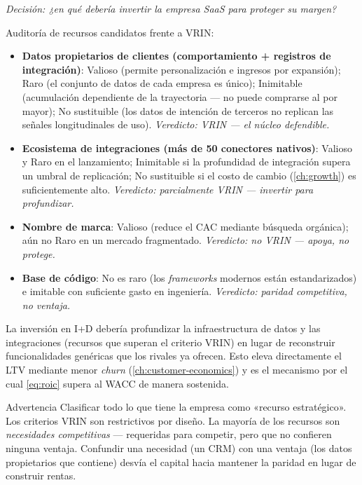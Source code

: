\begin{example}
\emph{Decisión: ¿en qué debería invertir la empresa SaaS para proteger su margen?}

Auditoría de recursos candidatos frente a VRIN:

\begin{itemize}
  \item \textbf{Datos propietarios de clientes (comportamiento + registros de integración)}: Valioso
        (permite personalización e ingresos por expansión); Raro (el conjunto de datos de cada
        empresa es único); Inimitable (acumulación dependiente de la trayectoria --- no puede
        comprarse al por mayor); No sustituible (los datos de intención de terceros no replican
        las señales longitudinales de uso). \emph{Veredicto: VRIN --- el núcleo defendible.}
  \item \textbf{Ecosistema de integraciones (más de 50 conectores nativos)}: Valioso y Raro en el
        lanzamiento; Inimitable si la profundidad de integración supera un umbral de replicación;
        No sustituible si el costo de cambio (\cref{ch:growth}) es suficientemente alto.
        \emph{Veredicto: parcialmente VRIN --- invertir para profundizar.}
  \item \textbf{Nombre de marca}: Valioso (reduce el CAC mediante búsqueda orgánica); aún no
        Raro en un mercado fragmentado. \emph{Veredicto: no VRIN --- apoya, no protege.}
  \item \textbf{Base de código}: No es raro (los \emph{frameworks} modernos están estandarizados)
        e imitable con suficiente gasto en ingeniería. \emph{Veredicto: paridad competitiva, no
        ventaja.}
\end{itemize}

La inversión en I+D debería profundizar la infraestructura de datos y las integraciones
(recursos que superan el criterio VRIN) en lugar de reconstruir funcionalidades genéricas que
los rivales ya ofrecen. Esto eleva directamente el LTV mediante menor \emph{churn}
(\cref{ch:customer-economics}) y es el mecanismo por el cual \cref{eq:roic} supera al WACC
de manera sostenida.
\end{example}

\begin{admonition}{Advertencia}
Clasificar todo lo que tiene la empresa como «recurso estratégico». Los criterios VRIN son
restrictivos por diseño. La mayoría de los recursos son \emph{necesidades competitivas} ---
requeridas para competir, pero que no confieren ninguna ventaja. Confundir una necesidad (un
CRM) con una ventaja (los datos propietarios que contiene) desvía el capital hacia mantener
la paridad en lugar de construir rentas.
\end{admonition}


